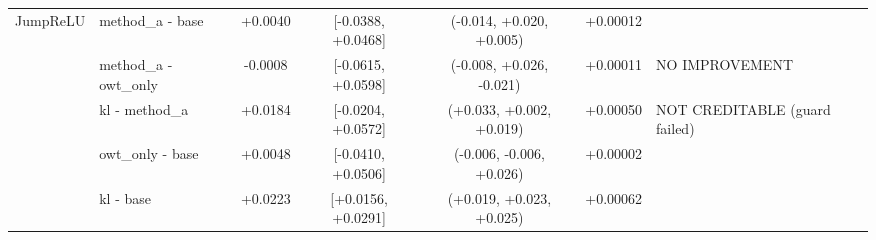 \begin{table}[t]
\begin{adjustbox}{max width=\linewidth}
\begin{tabular}{llccccl}
\midrule
JumpReLU & method\_a - base & +0.0040 & [-0.0388, +0.0468] & (-0.014, +0.020, +0.005) & +0.00012 &  \\
 & method\_a - owt\_only & -0.0008 & [-0.0615, +0.0598] & (-0.008, +0.026, -0.021) & +0.00011 & NO IMPROVEMENT \\
 & kl - method\_a & +0.0184 & [-0.0204, +0.0572] & (+0.033, +0.002, +0.019) & +0.00050 & NOT CREDITABLE (guard failed) \\
 & owt\_only - base & +0.0048 & [-0.0410, +0.0506] & (-0.006, -0.006, +0.026) & +0.00002 &  \\
 & kl - base & +0.0223 & [+0.0156, +0.0291] & (+0.019, +0.023, +0.025) & +0.00062 &  \\
\bottomrule
\end{tabular}
\end{adjustbox}
\end{table}
